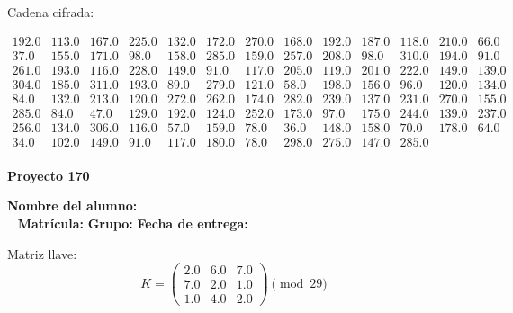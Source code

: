 \documentclass[12pt]{article}
\begin{document}
Cadena cifrada:
\begin{center}
$\begin{array}{lllllllllllll}
192.0 & 113.0 & 167.0 & 225.0 & 132.0 & 172.0 & 270.0 & 168.0 & 192.0 & 187.0 & 118.0 & 210.0 & 66.0\\
37.0 & 155.0 & 171.0 & 98.0 & 158.0 & 285.0 & 159.0 & 257.0 & 208.0 & 98.0 & 310.0 & 194.0 & 91.0\\
261.0 & 193.0 & 116.0 & 228.0 & 149.0 & 91.0 & 117.0 & 205.0 & 119.0 & 201.0 & 222.0 & 149.0 & 139.0\\
304.0 & 185.0 & 311.0 & 193.0 & 89.0 & 279.0 & 121.0 & 58.0 & 198.0 & 156.0 & 96.0 & 120.0 & 134.0\\
84.0 & 132.0 & 213.0 & 120.0 & 272.0 & 262.0 & 174.0 & 282.0 & 239.0 & 137.0 & 231.0 & 270.0 & 155.0\\
285.0 & 84.0 & 47.0 & 129.0 & 192.0 & 124.0 & 252.0 & 173.0 & 97.0 & 175.0 & 244.0 & 139.0 & 237.0\\
256.0 & 134.0 & 306.0 & 116.0 & 57.0 & 159.0 & 78.0 & 36.0 & 148.0 & 158.0 & 70.0 & 178.0 & 64.0\\
34.0 & 102.0 & 149.0 & 91.0 & 117.0 & 180.0 & 78.0 & 298.0 & 275.0 & 147.0 & 285.0\\
\end{array}$
\end{center}

\newpage


\textbf{Proyecto 170}

\textbf{Nombre del alumno:} \underline{\hspace{13cm}}\\\
\vspace{1cm}
\textbf{Matrícula:} \underline{\hspace{4cm}} \hspace{1cm}
\textbf{Grupo:} \underline{\hspace{2cm}}
\textbf{Fecha de entrega:} \underline{\hspace{2cm}}

\medskip

Matriz llave:
\[
K = \begin{pmatrix}
2.0 & 6.0 & 7.0\\
7.0 & 2.0 & 1.0\\
1.0 & 4.0 & 2.0
\end{pmatrix} \pmod{29}
\]
\end{document}
